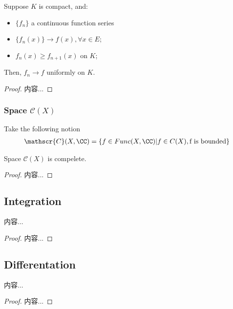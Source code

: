 \documentclass[Total.tex]{subfiles}
\begin{document}
			\begin{proposition}
				Suppose $K$ is compact, and:
				\begin{itemize}
					\item $\{f_n\}$ a continuous function series
					\item $\{f_n(x)\}\rightarrow f(x),\forall x\in E$;
					\item $f_n(x)\geq f_{n+1}(x)$ on $K$;
				\end{itemize}
				
				Then, $f_n\rightarrow f$ uniformly on $K$.
			\end{proposition}
			\begin{proof}
				内容...
			\end{proof}
			
			\subsubsection{Space $\mathscr{C}(X)$}
			
			
			\begin{Def}
				Take the following notion
				\begin{gather*}
					\mathscr{C}(X,\CC)=\{f\in Func(X,\CC)|f\in C(X),\mbox{f is bounded}\}
				\end{gather*}
			\end{Def}
			
			\begin{proposition}
				Space $\mathscr{C}(X)$ is compelete.
			\end{proposition}
			\begin{proof}
				内容...
			\end{proof}
			\subsection{Integration}
			\begin{theorem}
				内容...
			\end{theorem}
			\begin{proof}
				内容...
			\end{proof}
			\subsection{Differentation}
			
			\begin{theorem}
				内容...
			\end{theorem}
			\begin{proof}
				内容...
			\end{proof}
\end{document}
